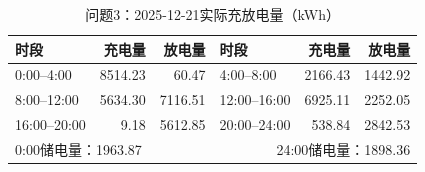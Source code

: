 \begin{table}[H]\centering\small
\caption{问题3：2025-12-21实际充放电量（kWh）}
\label{tab:q3_1221_storage}
\begin{tabular}{lrrlrr}\toprule
时段 & 充电量 & 放电量 & 时段 & 充电量 & 放电量\\\midrule
0:00--4:00 & 8514.23 & 60.47 & 4:00--8:00 & 2166.43 & 1442.92 \\
8:00--12:00 & 5634.30 & 7116.51 & 12:00--16:00 & 6925.11 & 2252.05 \\
16:00--20:00 & 9.18 & 5612.85 & 20:00--24:00 & 538.84 & 2842.53 \\
\midrule\multicolumn{3}{l}{0:00储电量：1963.87} & \multicolumn{3}{r}{24:00储电量：1898.36}\\
\bottomrule\end{tabular}\end{table}
